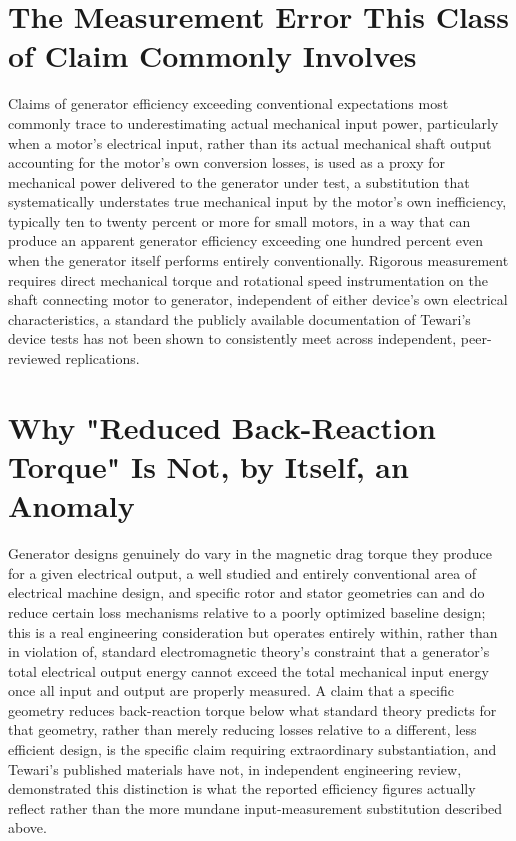 \documentclass[11pt]{article}
\begin{document}
\section{The Measurement Error This Class of Claim Commonly Involves}

Claims of generator efficiency exceeding conventional expectations most commonly trace to underestimating actual mechanical input power, particularly when a motor's electrical input, rather than its actual mechanical shaft output accounting for the motor's own conversion losses, is used as a proxy for mechanical power delivered to the generator under test, a substitution that systematically understates true mechanical input by the motor's own inefficiency, typically ten to twenty percent or more for small motors, in a way that can produce an apparent generator efficiency exceeding one hundred percent even when the generator itself performs entirely conventionally. Rigorous measurement requires direct mechanical torque and rotational speed instrumentation on the shaft connecting motor to generator, independent of either device's own electrical characteristics, a standard the publicly available documentation of Tewari's device tests has not been shown to consistently meet across independent, peer-reviewed replications.

\section{Why "Reduced Back-Reaction Torque" Is Not, by Itself, an Anomaly}

Generator designs genuinely do vary in the magnetic drag torque they produce for a given electrical output, a well studied and entirely conventional area of electrical machine design, and specific rotor and stator geometries can and do reduce certain loss mechanisms relative to a poorly optimized baseline design; this is a real engineering consideration but operates entirely within, rather than in violation of, standard electromagnetic theory's constraint that a generator's total electrical output energy cannot exceed the total mechanical input energy once all input and output are properly measured. A claim that a specific geometry reduces back-reaction torque below what standard theory predicts for that geometry, rather than merely reducing losses relative to a different, less efficient design, is the specific claim requiring extraordinary substantiation, and Tewari's published materials have not, in independent engineering review, demonstrated this distinction is what the reported efficiency figures actually reflect rather than the more mundane input-measurement substitution described above.
\end{document}
